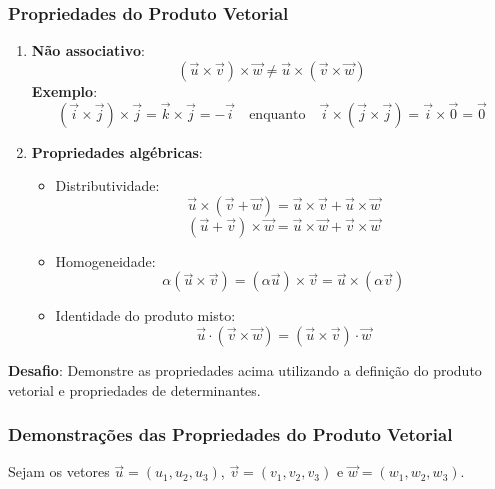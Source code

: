 \subsubsection*{Propriedades do Produto Vetorial}
\begin{enumerate}
  \item \textbf{Não associativo}:
    \[
      (\vec{u} \times \vec{v}) \times \vec{w} \neq \vec{u} \times (\vec{v} \times \vec{w})
    \]
    \textbf{Exemplo}:
    \[
      (\vec{i} \times \vec{j}) \times \vec{j} = \vec{k} \times \vec{j} = -\vec{i} \quad \text{enquanto} \quad \vec{i} \times (\vec{j} \times \vec{j}) = \vec{i} \times \vec{0} = \vec{0}
    \]

  \item \textbf{Propriedades algébricas}:
    \begin{itemize}
      \item Distributividade:
        \[
          \vec{u} \times (\vec{v} + \vec{w}) = \vec{u} \times \vec{v} + \vec{u} \times \vec{w}
        \]
        \[
          (\vec{u} + \vec{v}) \times \vec{w} = \vec{u} \times \vec{w} + \vec{v} \times \vec{w}
        \]

      \item Homogeneidade:
        \[
          \alpha(\vec{u} \times \vec{v}) = (\alpha\vec{u}) \times \vec{v} = \vec{u} \times (\alpha\vec{v})
        \]

      \item Identidade do produto misto:
        \[
          \vec{u} \cdot (\vec{v} \times \vec{w}) = (\vec{u} \times \vec{v}) \cdot \vec{w}
        \]
    \end{itemize}
\end{enumerate}

\begin{center}
\begin{minipage}{0.9\textwidth}
  \textbf{Desafio}: Demonstre as propriedades acima utilizando a definição do
  produto vetorial e propriedades de determinantes.
\end{minipage}
\end{center}

\subsubsection*{Demonstrações das Propriedades do Produto Vetorial}

Sejam os vetores $\vec{u} = (u_1, u_2, u_3)$, $\vec{v} = (v_1, v_2, v_3)$ e $\vec{w} = (w_1, w_2, w_3)$.

